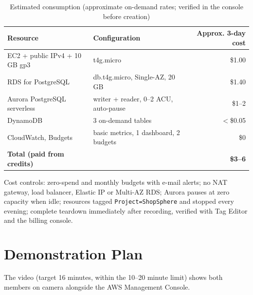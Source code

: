 \documentclass[11pt,a4paper]{article}
\begin{document}
\begin{table}[H]
\centering\small
\begin{tabularx}{\linewidth}{@{}X l r@{}}
\toprule
\textbf{Resource} & \textbf{Configuration} & \textbf{Approx. 3-day cost}\\
\midrule
EC2 + public IPv4 + 10\,GB gp3 & t4g.micro & \$1.00\\
RDS for PostgreSQL & db.t4g.micro, Single-AZ, 20\,GB & \$1.40\\
Aurora PostgreSQL serverless & writer + reader, 0--2 ACU, auto-pause & \$1--2\\
DynamoDB & 3 on-demand tables & $<$\$0.05\\
CloudWatch, Budgets & basic metrics, 1 dashboard, 2 budgets & \$0\\
\midrule
\textbf{Total (paid from credits)} & & \textbf{\$3--6}\\
\bottomrule
\end{tabularx}
\caption{Estimated consumption (approximate on-demand rates; verified in the console before creation)}
\end{table}

Cost controls: zero-spend and monthly budgets with e-mail alerts; no NAT gateway, load balancer, Elastic IP or Multi-AZ RDS; Aurora pauses at zero capacity when idle; resources tagged \texttt{Project=ShopSphere} and stopped every evening; complete teardown immediately after recording, verified with Tag Editor and the billing console.

\section{Demonstration Plan}
The video (target 16 minutes, within the 10--20 minute limit) shows both members on camera alongside the AWS Management Console.
\end{document}

